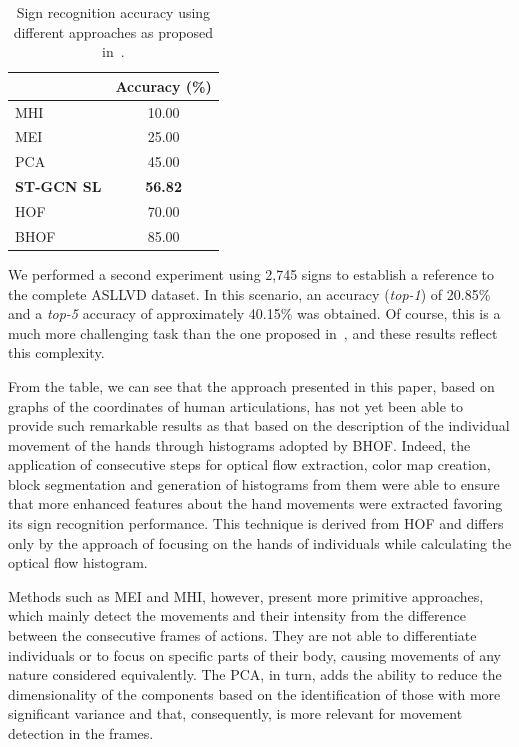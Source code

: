 \begin{table}[ht]
\centering
\caption{Sign recognition accuracy using different approaches as proposed in~\cite{lim-2016}.}
\label{tab:results-comparison-20}
\begin{tabular}{lc}
\hline
                   & Accuracy (\%)  \\ \hline
MHI                & 10.00                     \\
MEI                & 25.00                     \\
PCA                & 45.00                     \\
\textbf{ST-GCN SL} & \textbf{56.82}            \\
HOF                & 70.00                     \\
BHOF               & 85.00                     \\ \hline
\end{tabular}
\end{table}


We performed a second experiment using 2,745 signs to establish a reference to the complete ASLLVD dataset. In this scenario, an accuracy (\textit{top-1}) of 20.85\% and a \textit{top-5} accuracy of approximately 40.15\% was obtained. Of course, this is a much more challenging task than the one proposed in~\cite{lim-2016}, and these results reflect this complexity.

From the table, we can see that the approach presented in this paper, based on graphs of the coordinates of human articulations, has not yet been able to provide such remarkable results as that based on the description of the individual movement of the hands through histograms adopted by BHOF. Indeed, the application of consecutive steps for optical flow extraction, color map creation, block segmentation and generation of histograms from them were able to ensure that more enhanced features about the hand movements were extracted favoring its sign recognition performance. This technique is derived from HOF and differs only by the approach of focusing on the hands of individuals while calculating the optical flow histogram.

Methods such as MEI and MHI, however, present more primitive approaches, which mainly detect the movements and their intensity from the difference between the consecutive frames of actions. They are not able to differentiate individuals or to focus on specific parts of their body, causing movements of any nature considered equivalently. The PCA, in turn, adds the ability to reduce the dimensionality of the components based on the identification of those with more significant variance and that, consequently, is more relevant for movement detection in the frames.

